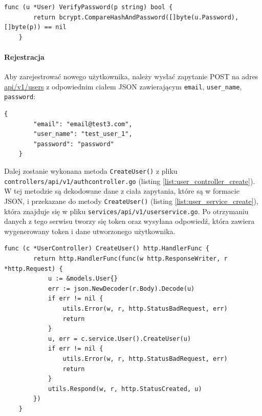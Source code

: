 \begin{lstlisting}[label=list:validate_password,caption=Porównywanie hasła.,basicstyle=\tiny\ttfamily]
    func (u *User) VerifyPassword(p string) bool {
        return bcrypt.CompareHashAndPassword([]byte(u.Password), []byte(p)) == nil
    }
\end{lstlisting}

\paragraph{Rejestracja\newline}
Aby zarejestrować nowego użytkownika, należy wysłać zapytanie POST na adres \url{api/v1/users} z odpowiednim ciałem JSON zawierającym \texttt{email}, \texttt{user\_name}, \texttt{password}:
\begin{lstlisting}[basicstyle=\tiny\ttfamily]
    {
        "email": "email@test3.com",
        "user_name": "test_user_1",
        "password": "password"
    }
\end{lstlisting}

Dalej zostanie wykonana metoda \texttt{CreateUser()} z pliku \texttt{controllers/api/v1/authcontroller.go} (listing \ref{list:user_controller_create}).
W tej metodzie są dekodowane dane z ciała zapytania, które są w formacie JSON, i przekazane do metody \texttt{CreateUser()} (listing \ref{list:user_service_create}), która znajduje się w pliku \texttt{services/api/v1/userservice.go}. Po otrzymaniu danych z tego serwisu tworzy się token oraz wysyłana odpowiedź, która zawiera wygenerowany token i dane utworzonego użytkownika.
\begin{lstlisting}[label=list:user_controller_create,caption=Kontroler tworzenia użytkownika.,basicstyle=\tiny\ttfamily]
    func (c *UserController) CreateUser() http.HandlerFunc {
        return http.HandlerFunc(func(w http.ResponseWriter, r *http.Request) {
            u := &models.User{}
            err := json.NewDecoder(r.Body).Decode(u)
            if err != nil {
                utils.Error(w, r, http.StatusBadRequest, err)
                return
            }
            u, err = c.service.User().CreateUser(u)
            if err != nil {
                utils.Error(w, r, http.StatusBadRequest, err)
                return
            }
            utils.Respond(w, r, http.StatusCreated, u)
        })
    }
\end{lstlisting}

